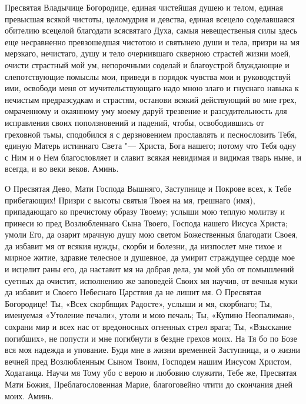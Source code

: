 \begin{mymulticols}
Пресвятая Владычице Богородице, единая чистейшая душею и телом, единая превысшая всякой чистоты, целомудрия и девства, единая всецело соделавшаяся обителию всецелой благодати всясвятаго Духа, самыя невещественыя силы здесь еще несравненно превзошедшая чистотою и святынею души и тела, призри на мя мерзкаго, нечистаго, душу и тело очернившаго скверною страстей жизни моей, очисти страстный мой ум, непорочными соделай и благоустрой блуждающие и слепотствующие помыслы мои, приведи в порядок чувства мои и руководствуй ими, освободи меня от мучительствующаго надо мною злаго и гнуснаго навыка к нечистым предразсудкам и страстям, останови всякий действующий во мне грех, омраченному и окаянному уму моему даруй трезвение и разсудительность для исправления своих поползновений и падений, чтобы, освободившись от греховной тьмы, сподобился я с дерзновением прославлять и песнословить Тебя, единую Матерь истиннаго Света "--- Христа, Бога нашего; потому что Тебя одну с Ним и о Нем благословляет и славит всякая невидимая и видимая тварь ныне, и всегда, и во веки веков. Аминь.




О Пресвятая Дево, Мати Господа Вышняго, Заступнице и Покрове всех, к Тебе прибегающих! Призри с высоты святыя Твоея на мя, грешнаго (имя), припадающаго ко пречистому образу Твоему; услыши мою теплую молитву и принеси ю пред Возлюбленнаго Сына Твоего, Господа нашего Иисуса Христа; умоли Его, да озарит мрачную душу мою светом Божественныя благодати Своея, да избавит мя от всякия нужды, скорби и болезни, да низпослет мне тихое и мирное житие, здравие телесное и душевное, да умирит страждущее сердце мое и исцелит раны его, да наставит мя на добрая дела, ум мой убо от помышлений суетных да очистит, исполнению же заповедей Своих мя научив, от вечныя муки да избавит и Своего Небеснаго Царствия да не лишит мя. О Пресвятая Богородице! Ты, «Всех скорбящих Радосте», услыши и мя, скорбнаго; Ты, именуемая «Утоление печали», утоли и мою печаль; Ты, «Купино Неопалимая», сохрани мир и всех нас от вредоносных огненных стрел врага; Ты, «Взыскание погибших», не попусти и мне погибнути в бездне грехов моих. На Тя бо по Бозе вся моя надежда и упование. Буди мне в жизни временней Заступница, и о жизни вечней пред Возлюбленным Сыном Твоим, Господем нашим Иисусом Христом, Ходатаица. Научи мя Тому убо с верою и любовию служити, Тебе же, Пресвятая Мати Божия, Преблагословенная Марие, благоговейно чтити до скончания дней моих. Аминь.

\end{mymulticols}

